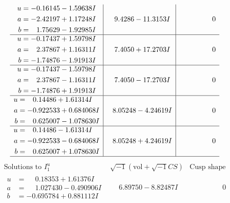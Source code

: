 \documentclass[1p]{elsarticle_modified}
\theoremstyle{definition}
\newcommand{\I}{\sqrt{-1}}
\begin{document}
$$\begin{array}{c|c|c}
\begin{aligned}
u &= -0.16145 - 1.59638 I \\
a &= -2.42197 + 1.17248 I \\
b &= \phantom{-}1.75629 - 1.92985 I\end{aligned}
 & \phantom{-}9.4286 - 11.3153 I & \phantom{-0.000000 } 0 \\ \hline\begin{aligned}
u &= -0.17437 + 1.59798 I \\
a &= \phantom{-}2.37867 + 1.16311 I \\
b &= -1.74876 - 1.91913 I\end{aligned}
 & \phantom{-}7.4050 + 17.2703 I & \phantom{-0.000000 } 0 \\ \hline\begin{aligned}
u &= -0.17437 - 1.59798 I \\
a &= \phantom{-}2.37867 - 1.16311 I \\
b &= -1.74876 + 1.91913 I\end{aligned}
 & \phantom{-}7.4050 - 17.2703 I & \phantom{-0.000000 } 0 \\ \hline\begin{aligned}
u &= \phantom{-}0.14486 + 1.61314 I \\
a &= -0.922533 + 0.684068 I \\
b &= \phantom{-}0.625007 - 1.078630 I\end{aligned}
 & \phantom{-}8.05248 - 4.24619 I & \phantom{-0.000000 } 0 \\ \hline\begin{aligned}
u &= \phantom{-}0.14486 - 1.61314 I \\
a &= -0.922533 - 0.684068 I \\
b &= \phantom{-}0.625007 + 1.078630 I\end{aligned}
 & \phantom{-}8.05248 + 4.24619 I & \phantom{-0.000000 } 0\\
 \hline 
 \end{array}$$\newpage$$\begin{array}{c|c|c}  
\text{Solutions to }I^u_{1}& \I (\text{vol} + \sqrt{-1}CS) & \text{Cusp shape}\\
 \hline 
\begin{aligned}
u &= \phantom{-}0.18353 + 1.61376 I \\
a &= \phantom{-}1.027430 - 0.490906 I \\
b &= -0.695784 + 0.881112 I\end{aligned}
 & \phantom{-}6.89750 - 8.82487 I & \phantom{-0.000000 } 0 \\ \hline\begin{aligned}

\end{aligned}
\end{array}$$
\end{document}

